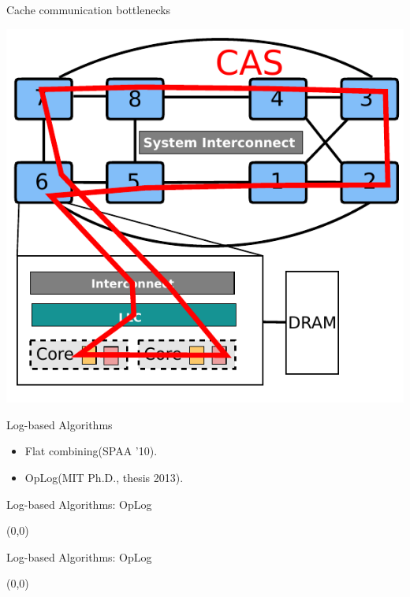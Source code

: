 \documentclass[english]{beamer} %
\begin{document}
\begin{frame}{Cache communication bottlenecks}
\begin{center}
\includegraphics[scale=0.8]{fig/archcache_cas_1}
\end{center}
\end{frame}


\begin{frame}{Log-based Algorithms}
    \begin{itemize}[<+-| alert@+>]
    \item Flat combining(SPAA '10).
    \item OpLog(MIT Ph.D., thesis 2013). 
    \end{itemize}
\end{frame}



\begin{frame}{Log-based Algorithms: OpLog}
\begin{textblock}{1}(0,0)
\end{textblock}
\end{frame}


\begin{frame}{Log-based Algorithms: OpLog}
\begin{textblock}{1}(0,0)
\end{textblock}
\end{frame}
\end{document}

